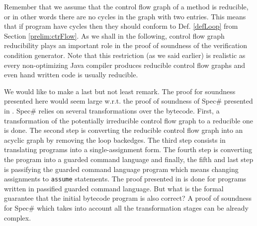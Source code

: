  

Remember that we assume that the control flow graph of a method is reducible, or in other words there 
are no cycles in the graph with two entries. This means that if program have cycles then they should 
conform to Def. \ref{defLoop} from Section \ref{prelim:ctrFlow}.
As we shall in the following, control flow graph reducibility plays an important role in
 the proof of soundness of the verification condition generator. 
Note that this restriction (as we said earlier) is realistic as every non-optimizing Java compiler produces
reducible control flow graphs and even hand written code is usually reducible.


We would like to make a last but not least remark. The proof for soundness presented here would seem large w.r.t. 
the proof of soundness of Spec\# presented in  \cite{leinoWPUP}. Spec\# relies on several transformations over the 
bytecode. First, a transformation of the potentially irreducible control flow graph to a reducible one is done.
The second step  is converting the reducible control flow graph into an acyclic graph by removing the loop backedges.
 The third step consists in translating programs into a single-assignment form.
The fourth step is converting the program into a  guarded command language and finally, the fifth and last 
step is passifying the guarded command language program which means changing assignments
to \texttt{assume} statements. The proof presented in  
\cite{leinoWPUP} is done for  programs written in passified guarded command language.
But what is the formal guarantee that the initial  bytecode program is also correct? 
A proof of soundness for Spec\# which takes into account all the transformation stages can be 
already complex. 
